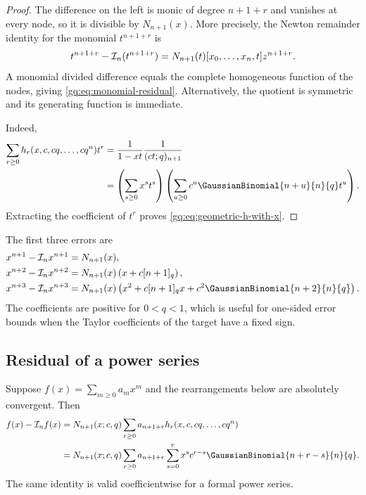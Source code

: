 \begin{proof}
The difference on the left is monic of degree $n+1+r$ and vanishes at every
node, so it is divisible by $N_{n+1}(x)$.  More precisely, the Newton
remainder identity for the monomial $t^{n+1+r}$ is
\[
 t^{n+1+r}-\mathcal I_n(t^{n+1+r})
 =N_{n+1}(t)[x_0,\ldots,x_n,t]z^{n+1+r}.
\]
A monomial divided difference equals the complete homogeneous function of
the nodes, giving \eqref{gq:eq:monomial-residual}.  Alternatively, the quotient
is symmetric and its generating function is immediate.

Indeed,
\begin{align*}
 \sum_{r\ge0}h_r(x,c,cq,\ldots,cq^n)t^r
 &=\frac1{1-xt}\frac1{(ct;q)_{n+1}}\\
 &=\left(\sum_{s\ge0}x^st^s\right)
   \left(\sum_{u\ge0}c^u\GaussianBinomial{n+u}{n}{q}t^u\right).
\end{align*}
Extracting the coefficient of $t^r$ proves
\eqref{gq:eq:geometric-h-with-x}.
\end{proof}

\begin{example}
The first three errors are
\begin{align*}
 x^{n+1}-\Interp_nx^{n+1}
 &=N_{n+1}(x),\\
 x^{n+2}-\Interp_nx^{n+2}
 &=N_{n+1}(x)\left(x+c[n+1]_q\right),\\
 x^{n+3}-\Interp_nx^{n+3}
 &=N_{n+1}(x)
 \left(x^2+c[n+1]_qx+c^2\GaussianBinomial{n+2}{n}{q}\right).
\end{align*}
The coefficients are positive for $0<q<1$, which is useful for one-sided
error bounds when the Taylor coefficients of the target have a fixed sign.
\end{example}

\subsection{Residual of a power series}

\begin{corollary}
\label{gq:cor:analytic-residual}
Suppose $f(x)=\sum_{m\ge0}a_mx^m$ and the rearrangements below are absolutely
convergent.  Then
\begin{align}
 f(x)-\Interp_nf(x)
 &=N_{n+1}(x;c,q)
   \sum_{r\ge0}a_{n+1+r}h_r(x,c,cq,\ldots,cq^n)
 \label{gq:eq:analytic-residual-h}\\
 &=N_{n+1}(x;c,q)
   \sum_{r\ge0}a_{n+1+r}
   \sum_{s=0}^rx^sc^{r-s}\GaussianBinomial{n+r-s}{n}{q}.
 \label{gq:eq:analytic-residual-q}
\end{align}
The same identity is valid coefficientwise for a formal power series.
\end{corollary}

